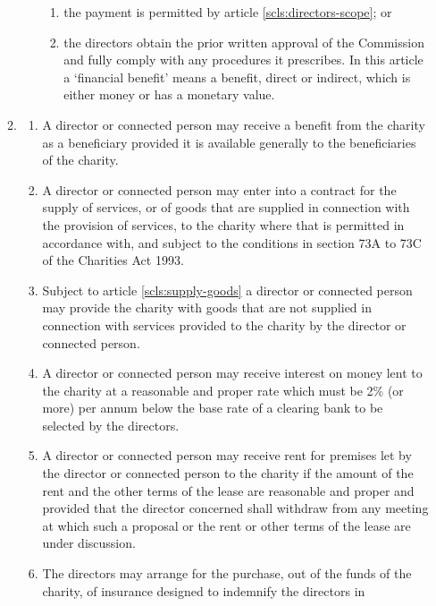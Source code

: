 \begin{enumerate}
\begin{enumerate}
\begin{enumerate}
      \begin{enumerate}
      \item
        the payment is permitted by article \ref{scls:directors-scope}; or
      \item
        the directors obtain the prior written approval of the Commission
        and fully comply with any procedures it prescribes. In this article
        a `financial benefit' means a benefit, direct or indirect, which is
        either money or has a monetary value.
      \end{enumerate}
    \end{enumerate}
  \item
    \label{scls:directors-scope}
    \begin{enumerate}
    \item
      A director or connected person may receive a benefit from the
      charity as a beneficiary provided it is available generally to the
      beneficiaries of the charity.
    \item
      A director or connected person may enter into a contract for the
      supply of services, or of goods that are supplied in connection
      with the provision of services, to the charity where that is
      permitted in accordance with, and subject to the conditions in
      section 73A to 73C of the Charities Act 1993.
    \item
      Subject to article \ref{scls:supply-goods} a director or connected
      person may provide the charity with goods that are not supplied in
      connection with services provided to the charity by the director or
      connected person. \label{art:directors-goods}
    \item
      A director or connected person may receive interest on money lent
      to the charity at a reasonable and proper rate which must be 2\%
      (or more) per annum below the base rate of a clearing bank to be
      selected by the directors.
    \item
      A director or connected person may receive rent for premises let by
      the director or connected person to the charity if the amount of
      the rent and the other terms of the lease are reasonable and proper
      and provided that the director concerned shall withdraw from any
      meeting at which such a proposal or the rent or other terms of the
      lease are under discussion.
    \item
      The directors may arrange for the purchase, out of the funds of the
      charity, of insurance designed to indemnify the directors in

\end{enumerate}
\end{enumerate}
\end{enumerate}
